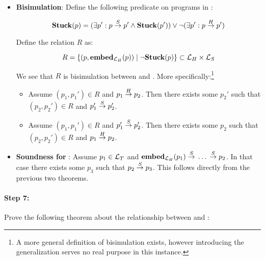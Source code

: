 \begin{itemize}
\item \textbf{Bisimulation}: Define the following predicate on
  programs in \highlang:

  $$\mathbf{Stuck}(p) = (\exists p': p {{}\stackrel{S}{->}{}} p' \land \mathbf{Stuck}(p')) \lor \neg(\exists p': p {{}\stackrel{H}{->}{}} p')$$

  Define the relation $R$ as:

  $$R = \{(p, {\mathbf{embed}}_{\mathcal{L}_H}(p)) \mid \neg\mathbf{Stuck}(p)\} \subset \mathcal{L}_H \times
  \mathcal{L}_S$$

  We see that $R$ is bisimulation between \higho{->} and \simpleo{->}. More
  specifically:\footnote{A more general definition of bisimulation exists,
    however introducing the generalization serves no real purpose in this
    instance.}
  \begin{itemize}
  \item Assume $(p_1, p_1') \in R$ and $p_1 {{}\stackrel{H}{->}{}} p_2$. Then there exists
    some $p_2'$ such that $(p_2, p_2') \in R$ and $p_1' {{}\stackrel{S}{->}{}} p_2'$.
  \item Assume $(p_1, p_1') \in R$ and $p_1' {{}\stackrel{S}{->}{}} p_2'$. Then there
    exists some $p_2$ such that $(p_2, p_2') \in R$ and
    $p_1 {{}\stackrel{H}{->}{}} p_2$.
  \end{itemize}
\item \textbf{Soundness for \simplelang}: Assume $p_1 \in \mathcal{L}_T$ and
  ${\mathbf{embed}}_{\mathcal{L}_H}(p_1) {{}\stackrel{S}{->}{}} \dots {{}\ensuremath{\stackrel{S}{->}}{}} p_2$. In that case there
  exists some $p_3$ such that $p_2 {{}\stackrel{S}{->}{}} p_3$. This follows
  directly from the previous two theorems.
\end{itemize}

\paragraph{Step 7:} Prove the following theorem about the relationship between
\simplelang and \nativelang:

